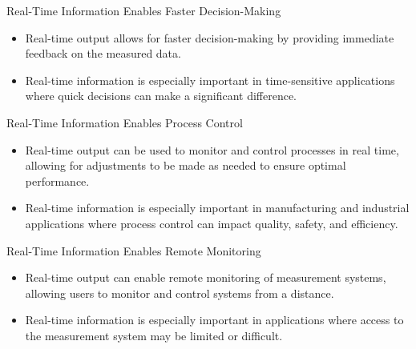 \begin{frame}{Real-Time Information Enables Faster Decision-Making}

\begin{itemize}
\item Real-time output allows for faster decision-making by providing immediate feedback on the measured data.
\item Real-time information is especially important in time-sensitive applications where quick decisions can make a significant difference.
\end{itemize}

\end{frame}

\begin{frame}{Real-Time Information Enables Process Control}

\begin{itemize}
\item Real-time output can be used to monitor and control processes in real time, allowing for adjustments to be made as needed to ensure optimal performance.
\item Real-time information is especially important in manufacturing and industrial applications where process control can impact quality, safety, and efficiency.
\end{itemize}

\end{frame}

\begin{frame}{Real-Time Information Enables Remote Monitoring}

\begin{itemize}
\item Real-time output can enable remote monitoring of measurement systems, allowing users to monitor and control systems from a distance.
\item Real-time information is especially important in applications where access to the measurement system may be limited or difficult.
\end{itemize}

\end{frame}


